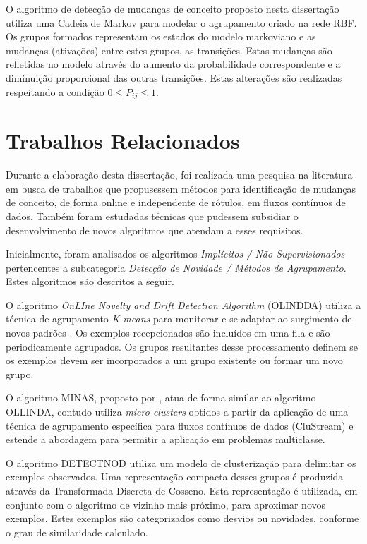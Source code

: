 \documentclass[msc, classic, a4paper]{ufbathesis}
\begin{document}
O algoritmo de detecção de mudanças de conceito proposto nesta dissertação utiliza uma Cadeia de Markov para modelar o agrupamento criado na rede RBF. Os grupos formados representam os estados do modelo markoviano e as mudanças (ativações) entre estes grupos, as transições.
Estas mudanças são refletidas no modelo através do aumento da probabilidade  correspondente e a diminuição proporcional das outras transições. Estas alterações são realizadas respeitando a condição $0 \leq P_{ij} \leq 1$.


\section{Trabalhos Relacionados}
\label{sec:trabalhos_relacionados}

Durante a elaboração desta dissertação, foi realizada uma pesquisa na literatura em busca de trabalhos que propusessem métodos para identificação de mudanças de conceito, de forma online e independente de rótulos, em fluxos contínuos de dados. Também foram estudadas técnicas que pudessem subsidiar o desenvolvimento de novos algoritmos que atendam a esses requisitos.

Inicialmente, foram analisados os algoritmos \textit{Implícitos / Não Supervisionados} pertencentes a subcategoria \textit{Detecção de Novidade / Métodos de Agrupamento}. Estes algoritmos são descritos a seguir.

O algoritmo \textit{OnLIne Novelty and Drift Detection Algorithm} (OLINDDA) utiliza a técnica de agrupamento \textit{K-means} para monitorar e se adaptar ao surgimento de novos padrões \cite{Spinosa:2007:OCA:1244002.1244107}.
Os exemplos recepcionados são incluídos em uma fila e são periodicamente agrupados. Os grupos resultantes desse processamento definem se os exemplos devem ser incorporados a um grupo existente ou formar um novo grupo.

O algoritmo MINAS, proposto por , atua de forma similar ao algoritmo OLLINDA, contudo utiliza \textit{micro clusters} obtidos a partir da aplicação de uma técnica de agrupamento específica para fluxos contínuos de dados (CluStream) e estende a abordagem para permitir a aplicação em problemas multiclasse.

O algoritmo DETECTNOD \cite{Hashemi:Hayat:DETECTNOD:2010} utiliza um modelo de clusterização para delimitar os exemplos observados.
Uma representação compacta desses grupos é produzida através da Transformada Discreta de Cosseno. Esta representação é utilizada, em conjunto com o algoritmo de vizinho mais próximo, para aproximar novos exemplos.
Estes exemplos são categorizados como desvios ou novidades, conforme o grau de similaridade calculado.
\end{document}
